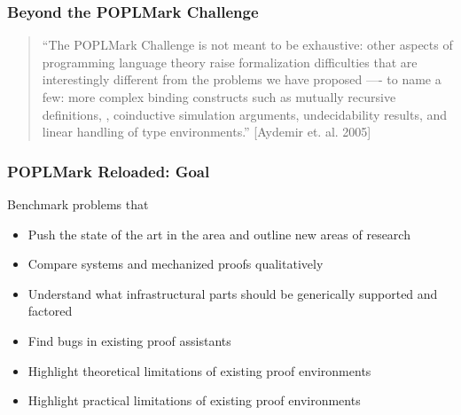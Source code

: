 \begin{frame}
  \frametitle{Beyond the POPLMark Challenge}

  \begin{quote}
``The
POPLMark
Challenge is not meant to be exhaustive: other aspects of programming language theory raise formalization difficulties that are interestingly
different from the problems we have proposed —- to name a few: more complex
binding constructs such as mutually recursive definitions,
, coinductive simulation arguments, undecidability results, and linear handling of
type environments.'' [Aydemir et. al. 2005]
  \end{quote}


\end{frame}







\begin{frame}\frametitle{POPLMark Reloaded: Goal}%

Benchmark problems that

\begin{itemize}
\item Push the state of the art in the area and outline new areas of research
\item Compare systems and mechanized proofs qualitatively
\item Understand what infrastructural parts should be generically supported and factored
\item Find bugs in existing proof assistants
\item Highlight theoretical limitations of existing proof environments
\item Highlight practical limitations of existing proof environments
\end{itemize}

\end{frame}


